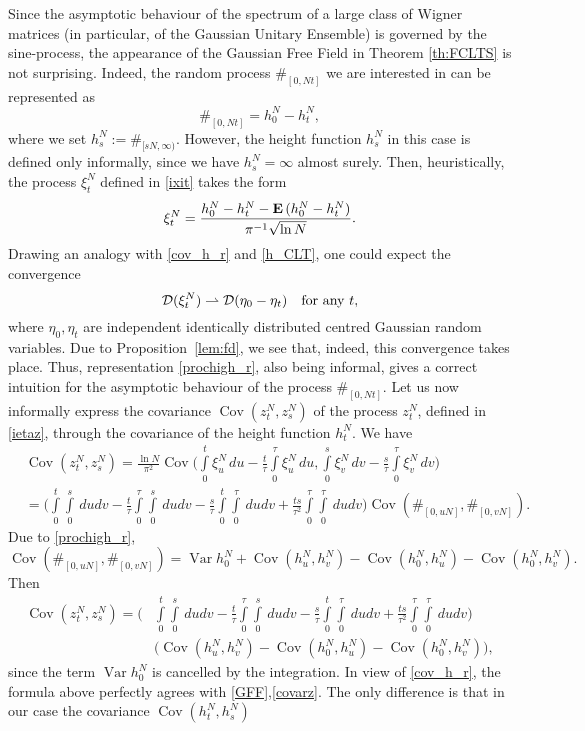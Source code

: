 \documentclass{article}
\numberwithin{equation}{section}
\newcommand{\DD}{{\cal D}}
\newcommand{\Cov}{\operatorname{Cov}}
\newcommand{\Var}{\operatorname{Var}}
\newcommand{\MO}{\mbox{\bf E}\,}
\newcommand{\raw}{\rightharpoonup}
\newcommand{\fr}{\frac}
\newcommand{\qmb}{\quad\mbox}
\newcommand{\ili}{\int\limits}
\newcommand{\lbl}{\label}
\newcommand{\rtheo}{Theorem \nolinebreak}
\newcommand{\bee}{\begin{equation}}
\newcommand{\eee}{\end{equation}}
\newcommand{\non}{\nonumber}
\begin{document}
Since the asymptotic behaviour of the spectrum of a large class of Wigner matrices 
(in particular, of the Gaussian Unitary Ensemble) is governed by the sine-process,
the appearance of the Gaussian Free Field in \rtheo\ref{th:FCLTS} is not surprising.
Indeed, the random process $\#_{[0,Nt]}$ we are interested in can be represented as
\bee
\lbl{prochigh_r}
\#_{[0,Nt]}=h_0^N-h_t^N,
\eee
where we set $h_s^N:=\#_{[sN,\infty)}$. 
However, the height function $h_s^N$ in this case is defined only informally, since we have $h_s^N=\infty$ almost surely.
Then, heuristically,
the process $\xi_t^N$ defined in \eqref{ixit}  takes the form
$$
\xi^N_t=\fr{h_0^N-h_t^N-\MO(h_0^N-h_t^N)}{\pi^{-1}\sqrt{\ln N}}.
$$
Drawing an analogy with \eqref{cov_h_r} and \eqref{h_CLT}, one could expect the convergence 
$$
\DD(\xi^N_t)\raw\DD(\eta_0-\eta_t) 
\qmb{for any }t,
$$
where $\eta_0,\eta_t$ are independent identically distributed centred Gaussian random variables.
Due to Proposition~\ref{lem:fd}, we see that, indeed, this convergence takes place. 
Thus, representation \eqref{prochigh_r}, also being informal,
gives a correct intuition for the asymptotic behaviour of the process $\#_{[0,Nt]}$.
Let us now informally express the covariance $\Cov(z_t^N,z_s^N)$ of the process $z_t^N$, 
defined in \eqref{ietaz}, through the covariance of the height function $h_t^N$.
We have
\begin{align}\lbl{covzz_r}
&\Cov(z_t^N,z_s^N)
=
\fr{\ln N}{\pi^2}\Cov\Big(\ili_0^t\xi_u^N\,du-\frac{t}{\tau}\ili_0^\tau\xi^N_u\,du,
\ili_0^s\xi_v^N\,dv-\frac{s}{\tau}\ili_0^\tau\xi^N_v\,dv
\Big)\\\non
&=\Big(
\ili_0^t\ili_0^s\, dudv
-\fr{t}{\tau}\ili_0^\tau\ili_0^s\, dudv
-\fr{s}{\tau}\ili_0^t\ili_0^\tau \, dudv
+\fr{ts}{\tau^2}\ili_0^\tau\ili_0^\tau \, dudv
\Big)\Cov(\#_{[0,uN]},\#_{[0,vN]}).
\end{align}
Due to \eqref{prochigh_r},
\bee\lbl{cornp_r}
\Cov(\#_{[0,uN]},\#_{[0,vN]})=
\Var h_0^N+\Cov(h_u^N,h_v^N)-\Cov(h_0^N,h_u^N)-\Cov(h_0^N,h_v^N).
\eee
Then
\begin{align}\non
\Cov(z_t^N,z_s^N)
=\Big(&\ili_0^t\ili_0^s\, dudv
-\fr{t}{\tau}\ili_0^\tau\ili_0^s\, dudv
-\fr{s}{\tau}\ili_0^t\ili_0^\tau \, dudv
+\fr{ts}{\tau^2}\ili_0^\tau\ili_0^\tau \, dudv
\Big) \\\non
&\big(\Cov(h_u^N,h_v^N)-\Cov(h_0^N,h_u^N)-\Cov(h_0^N,h_v^N)\big),
\end{align}
since the term $\Var h_0^N$ is cancelled by the integration.
In view of \eqref{cov_h_r}, the formula above perfectly agrees with  \eqref{GFF},\eqref{covarz}. The only difference is that in our case the covariance $\Cov(h_t^N,h_s^N)$
\end{document}
